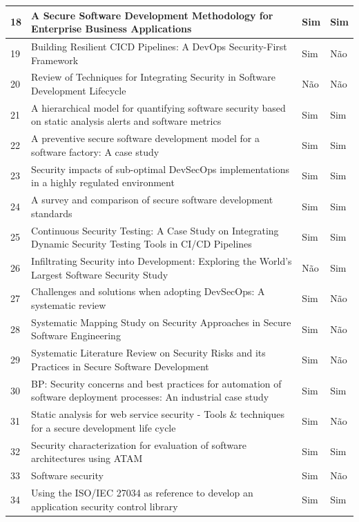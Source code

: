 \begin{longtable}{|p{1cm}|p{8cm}|p{3.5cm}|p{3cm}|}
    \hline
    18 & A Secure Software Development Methodology for Enterprise Business Applications & Sim & Sim \\
    \hline
    19 & Building Resilient CICD Pipelines: A DevOps Security-First Framework & Sim & Não \\
    \hline
    20 & Review of Techniques for Integrating Security in Software Development Lifecycle & Não & Não \\
    \hline
    21 & A hierarchical model for quantifying software security based on static analysis alerts and software metrics & Sim & Sim \\
    \hline
    22 & A preventive secure software development model for a software factory: A case study & Sim & Sim \\
    \hline
    23 & Security impacts of sub-optimal DevSecOps implementations in a highly regulated environment & Sim & Sim \\
    \hline
    24 & A survey and comparison of secure software development standards & Sim & Sim \\
    \hline
    25 & Continuous Security Testing: A Case Study on Integrating Dynamic Security Testing Tools in CI/CD Pipelines & Sim & Sim \\
    \hline
    26 & Infiltrating Security into Development: Exploring the World's Largest Software Security Study & Não & Sim \\
    \hline
    27 & Challenges and solutions when adopting DevSecOps: A systematic review & Sim & Não \\
    \hline
    28 & Systematic Mapping Study on Security Approaches in Secure Software Engineering & Sim & Não \\
    \hline
    29 & Systematic Literature Review on Security Risks and its Practices in Secure Software Development & Sim & Não \\
    \hline
    30 & BP: Security concerns and best practices for automation of software deployment processes: An industrial case study & Sim & Sim \\
    \hline
    31 & Static analysis for web service security - Tools \& techniques for a secure development life cycle & Sim & Não \\
    \hline
    32 & Security characterization for evaluation of software architectures using ATAM & Sim & Sim \\
    \hline
    33 & Software security & Sim & Não \\
    \hline
    34 & Using the ISO/IEC 27034 as reference to develop an application security control library & Sim & Sim \\

\end{longtable}
